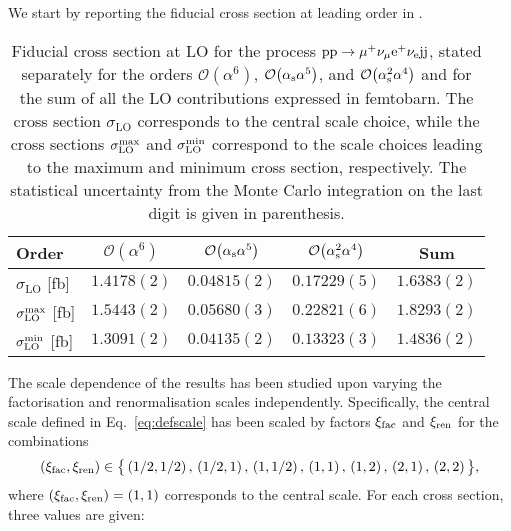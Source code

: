 \documentclass[a4article,11pt]{article}
\begin{document}
We start by reporting the fiducial cross section at leading order in .
\begin{table}
\begin{center}
\begin{tabular}{|l||c|c|c||c|}
\hline
Order & $\mathcal{O}{\left(\alpha^{6}\right)}$ & $\mathcal{O}{\left(\alpha_\text{s}\alpha^{5}\right)}$ & $\mathcal{O}{\left(\alpha_\text{s}^2\alpha^{4}\right)}$ & Sum \\
\hline
\hline
${\sigma_{\mathrm{LO}}}$ [fb] 
& $1.4178(2)$
& $0.04815(2)$
& $0.17229(5)$
& $1.6383(2)$ \\
\hline
\hline
$\sigma^{\rm max}_{\mathrm{LO}}$ [fb] 
& $1.5443(2)$
& $0.05680(3)$
& $0.22821(6)$
& $1.8293(2)$ \\
\hline
$\sigma^{\rm min}_{\mathrm{LO}}$ [fb] 
& $1.3091(2)$
& $0.04135(2)$
& $0.13323(3)$
& $1.4836(2)$ \\
\hline
\end{tabular}
\end{center}
\caption{
Fiducial cross section at LO for the process
$\text{p}\text{p}\to\mu^+\nu_\mu\text{e}^+\nu_{\text{e}}\text{j}\text{j}$, stated separately for the
orders  
$\mathcal{O}{\left(\alpha^{6}\right)}$, $\mathcal{O}{\left(\alpha_{\rm
      s}\alpha^{5}\right)}$, and $\mathcal{O}{\left(\alpha_{\rm
      s}^2\alpha^{4}\right)}$ and for the sum of all the LO
contributions expressed in femtobarn. 
The cross section ${\sigma_{\mathrm{LO}}}$ corresponds to the central
scale choice,
while the cross sections $\sigma^{\rm max}_{\mathrm{LO}}$ and $\sigma^{\rm min}_{\mathrm{LO}}$ correspond to the scale choices leading to the maximum and minimum cross section, respectively.
The statistical uncertainty from the Monte Carlo integration on the last digit is given in parenthesis.}
\label{table:LOcrosssection}
\end{table}
The scale dependence of the results has been studied upon varying the
factorisation and renormalisation scales independently. Specifically,
the central scale defined in Eq.~\eqref{eq:defscale} has been scaled by factors $\xi_{\rm fac}$ and $\xi_{\rm ren}$ for the combinations
%
\begin{align}
\label{eq:scales}
 (\xi_{\rm fac},\xi_{\rm ren}) \in \big\{\left(1/2,1/2\right),\,
 \left(1/2,1\right),\,
 \left(1,1/2\right),\,
 \left(1,1\right),\,
 \left(1,2\right),\,
 \left(2,1\right),\,
 \left(2,2\right)\big\},
\end{align}
where $(\xi_{\rm fac},\xi_{\rm ren}) = \left(1,1\right)$ corresponds
to the central scale.  For each cross section, three values are given:
\end{document}
